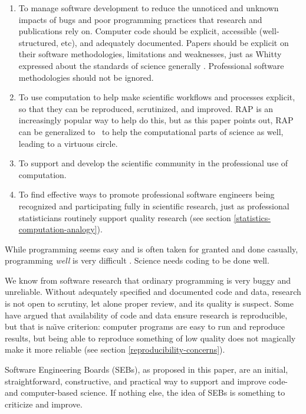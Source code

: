 \documentclass{comjnl}
\begin{document}
\begin{enumerate}\raggedright
\itemsep=1.5ex

\item 
To manage software development to reduce the unnoticed and unknown impacts of bugs and poor programming practices that research and publications rely on. Computer code should be explicit, accessible (well-structured, etc), and adequately documented. Papers should be explicit on their software methodologies, limitations and weaknesses, just as Whitty expressed about the standards of science generally \cite{whitty}. Professional software methodologies should not be ignored.

\item 
To use computation to help make scientific workflows and processes explicit, so that they can be reproduced, scrutinized, and improved. RAP is an increasingly popular way to help do this, but as this paper points out, RAP can be generalized to \RAPstar\ to help the computational parts of science as well, leading to a virtuous circle.

\item
To support and develop the scientific community in the professional use of computation.

\item
To find effective ways to promote professional software engineers being recognized and participating fully in scientific research, just as professional statisticians routinely support quality research (see section \ref{statistics-computation-analogy}).
\end{enumerate}

While programming seems easy and is often taken for granted and done casually, programming \emph{well\/} is very difficult \cite{fixit}. Science needs coding to be done well. 

We know from software research that ordinary programming is very buggy and unreliable. Without adequately specified and documented code and data, research is not open to scrutiny, let alone proper review, and its quality is suspect. Some have argued that availability of code and data ensure research is reproducible, but that is na\"\i ve criterion: computer programs are easy to run and reproduce results, but being able to reproduce something of low quality does not magically make it more reliable \cite{reproducibility,relit,popper-conjectures-refutations} (see section \ref{reproducibility-concerns}). 

Software Engineering Boards (SEBs), as proposed in this paper, are an initial, straightforward, constructive, and practical way to support and improve code- and computer-based science. If nothing else, the idea of SEBs is something to criticize and improve.
\end{document}
